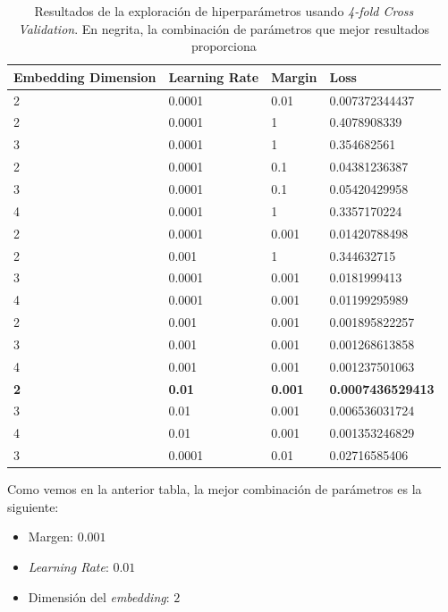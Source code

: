 \documentclass[11pt]{article}
\begin{document}
\begin{table}[H]
    \centering
    \begin{tabular}{|l|l|l|l|}
    \hline
        Embedding Dimension & Learning Rate & Margin & Loss \\ \hline
        2 & 0.0001 & 0.01 & 0.007372344437 \\
        2 & 0.0001 & 1 & 0.4078908339 \\
        3 & 0.0001 & 1 & 0.354682561 \\
        2 & 0.0001 & 0.1 & 0.04381236387 \\
        3 & 0.0001 & 0.1 & 0.05420429958 \\
        4 & 0.0001 & 1 & 0.3357170224 \\
        2 & 0.0001 & 0.001 & 0.01420788498 \\
        2 & 0.001 & 1 & 0.344632715 \\
        3 & 0.0001 & 0.001 & 0.0181999413 \\
        4 & 0.0001 & 0.001 & 0.01199295989 \\
        2 & 0.001 & 0.001 & 0.001895822257 \\
        3 & 0.001 & 0.001 & 0.001268613858 \\
        4 & 0.001 & 0.001 & 0.001237501063 \\
        \textbf{2} & \textbf{0.01} & \textbf{0.001} & \textbf{0.0007436529413} \\
        3 & 0.01 & 0.001 & 0.006536031724 \\
        4 & 0.01 & 0.001 & 0.001353246829 \\
        3 & 0.0001 & 0.01 & 0.02716585406 \\
      \hline
    \end{tabular}
    \caption{Resultados de la exploración de hiperparámetros usando \emph{4-fold Cross Validation}. En negrita, la combinación de parámetros que mejor resultados proporciona}
\end{table}

Como vemos en la anterior tabla, la mejor combinación de parámetros es la siguiente:

\begin{itemize}
  \item Margen: $0.001$
  \item \emph{Learning Rate}: $0.01$
  \item Dimensión del \emph{embedding}: $2$
\end{itemize}

\pagebreak
\end{document}
